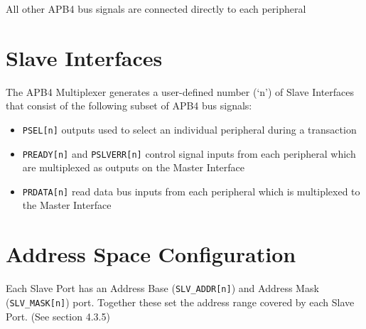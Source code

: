 All other APB4 bus signals are connected directly to each peripheral

\section{Slave Interfaces} \label{slave-interfaces}

The APB4 Multiplexer generates a user-defined number (`n') of Slave
Interfaces that consist of the following subset of APB4 bus signals:

\begin{itemize}
\item
  \texttt{PSEL[n]} outputs used to select an individual peripheral during a
  transaction
\item
  \texttt{PREADY[n]} and \texttt{PSLVERR[n]} control signal inputs from each
  peripheral which are multiplexed as outputs on the Master Interface
\item
  \texttt{PRDATA[n]} read data bus inputs from each peripheral which is
  multiplexed to the Master Interface
\end{itemize}

\section{Address Space Configuration} \label{address-space-configuration}

Each Slave Port has an Address Base (\texttt{SLV\_ADDR[n]}) and Address Mask
(\texttt{SLV\_MASK[n]}) port. Together these set the address range covered by
each Slave Port. (See section 4.3.5)

